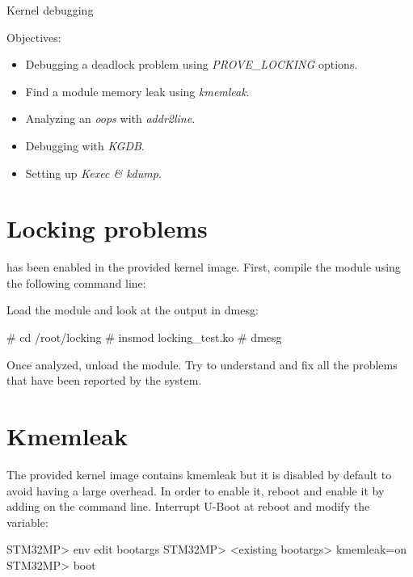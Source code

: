 \subchapter
{Kernel debugging}
{Objectives:
  \begin{itemize}
    \item Debugging a deadlock problem using {\em PROVE\_LOCKING} options.
    \item Find a module memory leak using {\em kmemleak}.
    \item Analyzing an {\em oops} with {\em addr2line}.
    \item Debugging with {\em KGDB}.
    \item Setting up {\em Kexec \& kdump}.
  \end{itemize}
}

\section{Locking problems}

 has been enabled in the provided kernel image.
First, compile the module using the following command line:


Load the  module and look at the output in dmesg:

\begin{bashinput}
# cd /root/locking
# insmod locking_test.ko
# dmesg
\end{bashinput}

Once analyzed, unload the module. Try to understand and fix all the problems that
have been reported by the  system.

\section{Kmemleak}

The provided kernel image contains kmemleak but it is disabled by default to
avoid having a large overhead. In order to enable it, reboot and enable it by
adding  on the command line. Interrupt U-Boot at reboot and
modify the  variable:

\begin{bashinput}
STM32MP> env edit bootargs
STM32MP> <existing bootargs> kmemleak=on
STM32MP> boot
\end{bashinput}

